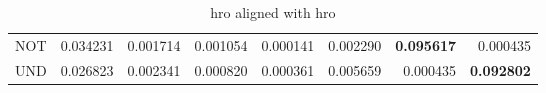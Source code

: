 \begin{table}[H]
\begin{center}
{\begin{tabular}{lrrrrrrr}
NOT & {\cellcolor[HTML]{C8E99B}} \color[HTML]{000000} 0.034231 & {\cellcolor[HTML]{FEFFE1}} \color[HTML]{000000} 0.001714 & {\cellcolor[HTML]{FEFFE2}} \color[HTML]{000000} 0.001054 & {\cellcolor[HTML]{FFFFE5}} \color[HTML]{000000} 0.000141 & {\cellcolor[HTML]{FEFFDE}} \color[HTML]{000000} 0.002290 & {\cellcolor[HTML]{0B713B}} \color[HTML]{F1F1F1} \bfseries 0.095617 & {\cellcolor[HTML]{FFFFE5}} \color[HTML]{000000} 0.000435 \\
UND & {\cellcolor[HTML]{DDF2A6}} \color[HTML]{000000} 0.026823 & {\cellcolor[HTML]{FEFFDE}} \color[HTML]{000000} 0.002341 & {\cellcolor[HTML]{FFFFE4}} \color[HTML]{000000} 0.000820 & {\cellcolor[HTML]{FFFFE5}} \color[HTML]{000000} 0.000361 & {\cellcolor[HTML]{FCFED4}} \color[HTML]{000000} 0.005659 & {\cellcolor[HTML]{FFFFE5}} \color[HTML]{000000} 0.000435 & {\cellcolor[HTML]{12763D}} \color[HTML]{F1F1F1} \bfseries 0.092802 \\
\bottomrule
\end{tabular}
}\end{center}
\caption{hro aligned with hro}\end{table}